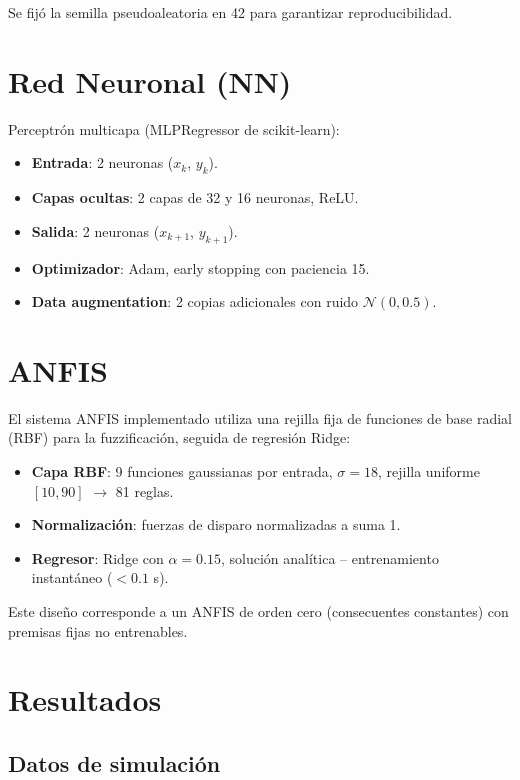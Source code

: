 \documentclass[twocolumn]{article}
\begin{document}
Se fijó la semilla pseudoaleatoria en 42 para garantizar reproducibilidad.

\section{Red Neuronal (NN)}

Perceptrón multicapa (MLPRegressor de scikit-learn):

\begin{itemize}
  \item \textbf{Entrada}: 2 neuronas ($x_k$, $y_k$).
  \item \textbf{Capas ocultas}: 2 capas de 32 y 16 neuronas, ReLU.
  \item \textbf{Salida}: 2 neuronas ($x_{k+1}$, $y_{k+1}$).
  \item \textbf{Optimizador}: Adam, early stopping con paciencia 15.
  \item \textbf{Data augmentation}: 2 copias adicionales con ruido
        $\mathcal{N}(0, 0.5)$.
\end{itemize}

\section{ANFIS}

El sistema ANFIS implementado utiliza una rejilla fija de funciones de
base radial (RBF) para la fuzzificación, seguida de regresión Ridge:

\begin{itemize}
  \item \textbf{Capa RBF}: 9 funciones gaussianas por entrada,
        $\sigma=18$, rejilla uniforme $[10, 90]$ $\to$ 81 reglas.
  \item \textbf{Normalización}: fuerzas de disparo normalizadas a suma 1.
  \item \textbf{Regresor}: Ridge con $\alpha=0.15$, solución analítica
        -- entrenamiento instantáneo ($<0.1$ s).
\end{itemize}

Este diseño corresponde a un ANFIS de orden cero (consecuentes constantes)
con premisas fijas no entrenables.

\section{Resultados}

\subsection{Datos de simulación}
\end{document}
